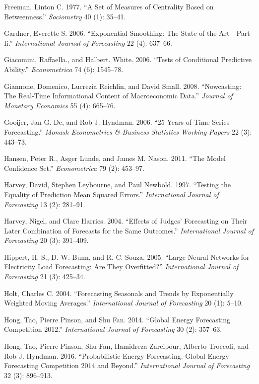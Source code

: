 \documentclass[11pt,a4paper]{elsarticle} %
\begin{document}
\hypertarget{ref-Freeman1977}{}
Freeman, Linton C. 1977. ``A Set of Measures of Centrality Based on
Betweenness.'' \emph{Sociometry} 40 (1): 35--41.

\hypertarget{ref-Gardner2006}{}
Gardner, Everette S. 2006. ``Exponential Smoothing: The State of the
Art---Part Ii.'' \emph{International Journal of Forecasting} 22 (4):
637--66.

\hypertarget{ref-Giacomini2006}{}
Giacomini, Raffaella., and Halbert. White. 2006. ``Tests of Conditional
Predictive Ability.'' \emph{Econometrica} 74 (6): 1545--78.

\hypertarget{ref-Giannone2008}{}
Giannone, Domenico, Lucrezia Reichlin, and David Small. 2008.
``Nowcasting: The Real-Time Informational Content of Macroeconomic
Data.'' \emph{Journal of Monetary Economics} 55 (4): 665--76.

\hypertarget{ref-Gooijer200625}{}
Gooijer, Jan G. De, and Rob J. Hyndman. 2006. ``25 Years of Time Series
Forecasting.'' \emph{Monash Econometrics \& Business Statistics Working
Papers} 22 (3): 443--73.

\hypertarget{ref-Hansen2011The}{}
Hansen, Peter R., Asger Lunde, and James M. Nason. 2011. ``The Model
Confidence Set.'' \emph{Econometrica} 79 (2): 453--97.

\hypertarget{ref-Harvey1997Testing}{}
Harvey, David, Stephen Leybourne, and Paul Newbold. 1997. ``Testing the
Equality of Prediction Mean Squared Errors.'' \emph{International
Journal of Forecasting} 13 (2): 281--91.

\hypertarget{ref-Harvey2004}{}
Harvey, Nigel, and Clare Harries. 2004. ``Effects of Judges' Forecasting
on Their Later Combination of Forecasts for the Same Outcomes.''
\emph{International Journal of Forecasting} 20 (3): 391--409.

\hypertarget{ref-Hippert2005Large}{}
Hippert, H. S., D. W. Bunn, and R. C. Souza. 2005. ``Large Neural
Networks for Electricity Load Forecasting: Are They Overfitted?''
\emph{International Journal of Forecasting} 21 (3): 425--34.

\hypertarget{ref-Holt2004}{}
Holt, Charles C. 2004. ``Forecasting Seasonals and Trends by
Exponentially Weighted Moving Averages.'' \emph{International Journal of
Forecasting} 20 (1): 5--10.

\hypertarget{ref-Hong2014}{}
Hong, Tao, Pierre Pinson, and Shu Fan. 2014. ``Global Energy Forecasting
Competition 2012.'' \emph{International Journal of Forecasting} 30 (2):
357--63.

\hypertarget{ref-Hong2016}{}
Hong, Tao, Pierre Pinson, Shu Fan, Hamidreza Zareipour, Alberto
Troccoli, and Rob J. Hyndman. 2016. ``Probabilistic Energy Forecasting:
Global Energy Forecasting Competition 2014 and Beyond.''
\emph{International Journal of Forecasting} 32 (3): 896--913.
\end{document}
